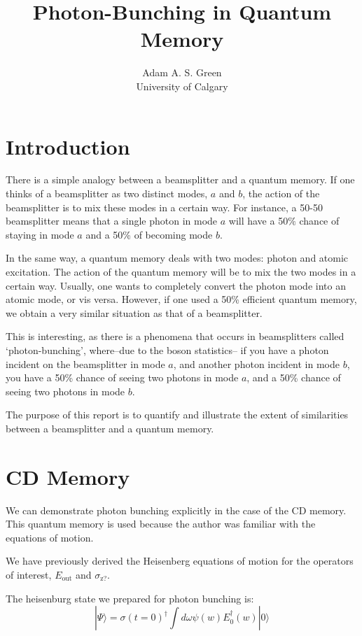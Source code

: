 \documentclass[12pt]{article}
\title{Photon-Bunching in Quantum Memory}
\author{Adam A. S. Green\\University of Calgary}
\begin{document}

\maketitle
\section{Introduction}

There is a simple analogy between a beamsplitter and a quantum memory. If one thinks of a beamsplitter as two distinct modes, $a$ and $b$, the action of the beamsplitter is to mix these modes in a certain way. For instance, a 50-50 beamsplitter means that a single photon in mode $a$ will have a 50$\%$ chance of staying in mode $a$ and a 50\% of becoming mode $b$.

In the same way, a quantum memory deals with two modes: photon and atomic excitation. The action of the quantum memory will be to mix the two modes in a certain way. Usually, one wants to completely convert the photon mode into an atomic mode, or vis versa. However, if one used a 50\% efficient quantum memory, we obtain a very similar situation as that of a beamsplitter.

This is interesting, as there is a phenomena that occurs in beamsplitters called `photon-bunching', where--due to the boson statistics-- if you have a photon incident on the beamsplitter in mode $a$, and another photon incident in mode $b$, you have a 50\% chance of seeing two photons in mode $a$, and a 50\% chance of seeing two photons in mode $b$. 

The purpose of this report is to quantify and illustrate the extent of similarities between a beamsplitter and a quantum memory.
\doublespacing
\section{CD Memory}
We can demonstrate photon bunching explicitly in the case of the CD memory\cite{arxiv}. This quantum memory is used because the author was familiar with the equations of motion.

We have previously derived the Heisenberg equations of motion for the operators of interest, $E_{\textrm{out}}$ and $\sigma_{\textrm{z?}}$.

The heisenburg state we prepared for photon bunching is:
\begin{equation}
| \Psi \rangle = \sigma(t=0)^\dagger \int d\omega \psi(w) E_0^\dagger(w) | 0 \rangle
\end{equation}
\end{document}
